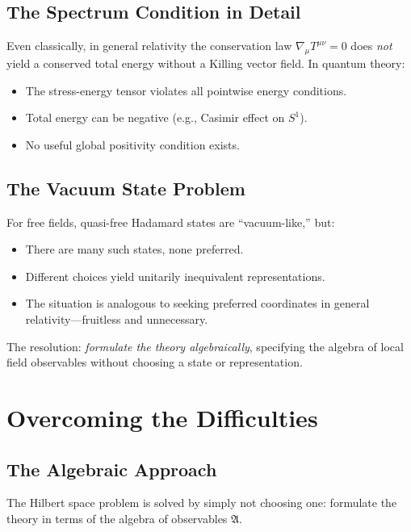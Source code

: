 \documentclass[11pt,a4paper]{article}
\begin{document}
\subsection{The Spectrum Condition in Detail}

Even classically, in general relativity the conservation law
$\nabla_\mu T^{\mu\nu} = 0$ does \emph{not} yield a conserved total
energy without a Killing vector field. In quantum theory:
\begin{itemize}[nosep]
  \item The stress-energy tensor violates all pointwise energy conditions.
  \item Total energy can be negative (e.g., Casimir effect on $S^1$).
  \item No useful global positivity condition exists.
\end{itemize}

\subsection{The Vacuum State Problem}

For free fields, quasi-free Hadamard states are ``vacuum-like,'' but:
\begin{itemize}[nosep]
  \item There are many such states, none preferred.
  \item Different choices yield unitarily inequivalent representations.
  \item The situation is analogous to seeking preferred coordinates in
        general relativity---fruitless and unnecessary.
\end{itemize}

The resolution: \emph{formulate the theory algebraically}, specifying
the algebra of local field observables without choosing a state or
representation.

\section{Overcoming the Difficulties}

\subsection{The Algebraic Approach}

The Hilbert space problem is solved by simply not choosing one: formulate
the theory in terms of the algebra of observables $\mathfrak{A}$.
\end{document}
